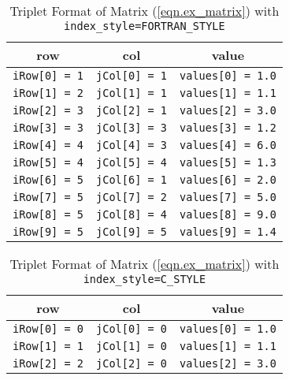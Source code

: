 \documentclass[10pt]{article}
\begin{document}
\begin{footnotesize}
\begin{table}[ht]%
\begin{center}
\caption{Triplet Format of Matrix (\ref{eqn.ex_matrix}) 
with {\tt index\_style=FORTRAN\_STYLE}}
\label{tab.sym_fortran_triplet}
\begin{tabular}{c c c}
row     		&       col     	&       value 			    \\
\hline
{\tt iRow[0] = 1}       &       {\tt jCol[0] = 1}       & {\tt values[0] = 1.0}     \\
{\tt iRow[1] = 2}       &       {\tt jCol[1] = 1}       & {\tt values[1] = 1.1}     \\
{\tt iRow[2] = 3}       &       {\tt jCol[2] = 1}       & {\tt values[2] = 3.0}     \\
{\tt iRow[3] = 3}       &       {\tt jCol[3] = 3}       & {\tt values[3] = 1.2}     \\
{\tt iRow[4] = 4}       &       {\tt jCol[4] = 3}       & {\tt values[4] = 6.0}     \\
{\tt iRow[5] = 4}       &       {\tt jCol[5] = 4}       & {\tt values[5] = 1.3}     \\
{\tt iRow[6] = 5}       &       {\tt jCol[6] = 1}       & {\tt values[6] = 2.0}     \\
{\tt iRow[7] = 5}       &       {\tt jCol[7] = 2}       & {\tt values[7] = 5.0}     \\
{\tt iRow[8] = 5}       &       {\tt jCol[8] = 4}       & {\tt values[8] = 9.0}     \\
{\tt iRow[9] = 5}       &       {\tt jCol[9] = 5}       & {\tt values[9] = 1.4}
\end{tabular}
\end{center}
\end{table}
\begin{table}[ht]%
\begin{center}
\caption{Triplet Format of Matrix (\ref{eqn.ex_matrix}) 
with {\tt index\_style=C\_STYLE}}
\label{tab.sym_c_triplet}
\begin{tabular}{c c c}
row     		&       col     	&       value 			    \\
\hline
{\tt iRow[0] = 0}       &       {\tt jCol[0] = 0}       & {\tt values[0] = 1.0}     \\
{\tt iRow[1] = 1}       &       {\tt jCol[1] = 0}       & {\tt values[1] = 1.1}     \\
{\tt iRow[2] = 2}       &       {\tt jCol[2] = 0}       & {\tt values[2] = 3.0}     \\

\end{tabular}
\end{center}
\end{table}
\end{footnotesize}
\end{document}
